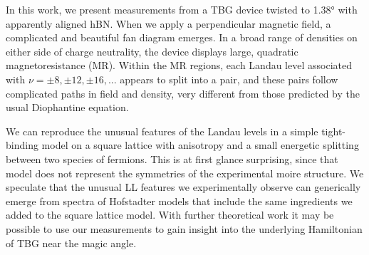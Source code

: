 \documentclass[12pt,twocolumn]{article}
\begin{document}
In this work, we present measurements from a TBG device twisted to 1.38° with apparently aligned hBN. When we apply a perpendicular magnetic field, a complicated and beautiful fan diagram emerges. In a broad range of densities on either side of charge neutrality, the device displays large, quadratic magnetoresistance (MR). Within the MR regions, each Landau level associated with $\nu=\pm 8, \pm 12, \pm 16, ...$ appears to split into a pair, and these pairs follow complicated paths in field and density, very different from those predicted by the usual Diophantine equation.

We can reproduce the unusual features of the Landau levels in a simple tight-binding model on a square lattice with anisotropy and a small energetic splitting between two species of fermions. This is at first glance surprising, since that model does not represent the symmetries of the experimental moire structure. We speculate that the unusual LL features we experimentally observe can  generically emerge from spectra of Hofstadter models that include the same ingredients we added to the square lattice model. With further theoretical work it may be possible to use our measurements to gain insight into the underlying Hamiltonian of TBG near the magic angle.
\end{document}

